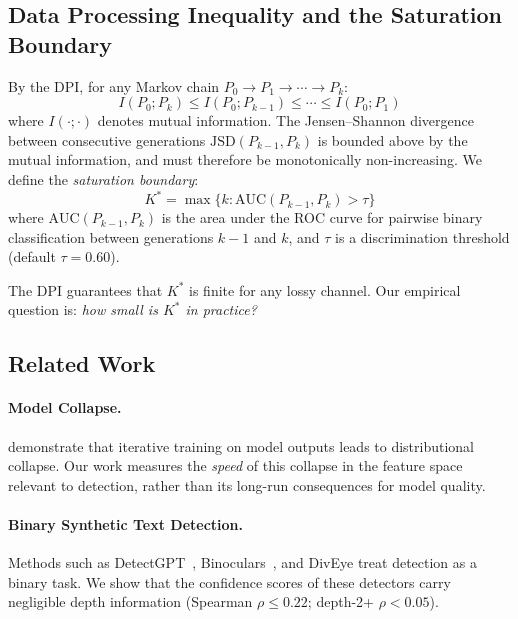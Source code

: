 \documentclass[11pt,a4paper]{article}
\begin{document}
\subsection{Data Processing Inequality and the Saturation Boundary}

By the DPI, for any Markov chain $P_0 \to P_1 \to \cdots \to P_k$:
\begin{equation}
    I(P_0; P_k) \leq I(P_0; P_{k-1}) \leq \cdots \leq I(P_0; P_1)
\end{equation}
where $I(\cdot;\cdot)$ denotes mutual information.
The Jensen--Shannon divergence between consecutive generations $\text{JSD}(P_{k-1}, P_k)$ is bounded above by the mutual information, and must therefore be monotonically non-increasing.
We define the \emph{saturation boundary}:
\begin{equation}
    K^* = \max\{k : \text{AUC}(P_{k-1}, P_k) > \tau\}
\end{equation}
where $\text{AUC}(P_{k-1}, P_k)$ is the area under the ROC curve for pairwise binary classification between generations $k{-}1$ and $k$, and $\tau$ is a discrimination threshold (default $\tau=0.60$).

The DPI guarantees that $K^*$ is finite for any lossy channel.
Our empirical question is: \emph{how small is $K^*$ in practice?}

\subsection{Related Work}

\paragraph{Model Collapse.} \citet{shumailov2024ai} demonstrate that iterative training on model outputs leads to distributional collapse. Our work measures the \emph{speed} of this collapse in the feature space relevant to detection, rather than its long-run consequences for model quality.

\paragraph{Binary Synthetic Text Detection.} Methods such as DetectGPT~\cite{mitchell2023detectgpt}, Binoculars~\cite{hans2024binoculars}, and DivEye treat detection as a binary task. We show that the confidence scores of these detectors carry negligible depth information (Spearman $\rho \leq 0.22$; depth-2+ $\rho < 0.05$).
\end{document}
